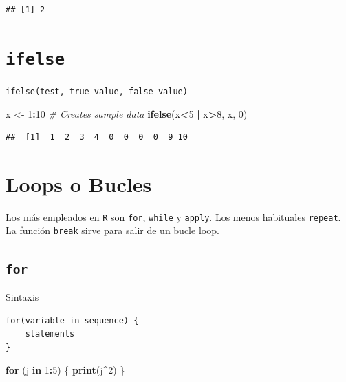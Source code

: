 \documentclass[]{book}
\newenvironment{Shaded}{\begin{snugshade}}{\end{snugshade}}
\newcommand{\KeywordTok}[1]{\textcolor[rgb]{0.13,0.29,0.53}{\textbf{#1}}}
\newcommand{\DecValTok}[1]{\textcolor[rgb]{0.00,0.00,0.81}{#1}}
\newcommand{\StringTok}[1]{\textcolor[rgb]{0.31,0.60,0.02}{#1}}
\newcommand{\CommentTok}[1]{\textcolor[rgb]{0.56,0.35,0.01}{\textit{#1}}}
\newcommand{\ControlFlowTok}[1]{\textcolor[rgb]{0.13,0.29,0.53}{\textbf{#1}}}
\newcommand{\OperatorTok}[1]{\textcolor[rgb]{0.81,0.36,0.00}{\textbf{#1}}}
\newcommand{\NormalTok}[1]{#1}
\begin{document}
\begin{verbatim}
## [1] 2
\end{verbatim}

\section{\texorpdfstring{\texttt{ifelse}}{ifelse}}\label{ifelse}

\texttt{ifelse(test,\ true\_value,\ false\_value)}

\begin{Shaded}
\begin{Highlighting}[]
\NormalTok{x <-}\StringTok{ }\DecValTok{1}\OperatorTok{:}\DecValTok{10} \CommentTok{# Creates sample data}
\KeywordTok{ifelse}\NormalTok{(x}\OperatorTok{<}\DecValTok{5} \OperatorTok{|}\StringTok{ }\NormalTok{x}\OperatorTok{>}\DecValTok{8}\NormalTok{, x, }\DecValTok{0}\NormalTok{)}
\end{Highlighting}
\end{Shaded}

\begin{verbatim}
##  [1]  1  2  3  4  0  0  0  0  9 10
\end{verbatim}

\section{Loops o Bucles}\label{loops-o-bucles}

Los más empleados en \texttt{R} son \texttt{for}, \texttt{while} y
\texttt{apply}. Los menos habituales \texttt{repeat}. La función
\texttt{break} sirve para salir de un bucle loop.

\subsection{\texorpdfstring{\texttt{for}}{for}}\label{for}

Sintaxis

\begin{verbatim}
for(variable in sequence) {
    statements
}
\end{verbatim}

\begin{Shaded}
\begin{Highlighting}[]
\ControlFlowTok{for}\NormalTok{ (j }\ControlFlowTok{in} \DecValTok{1}\OperatorTok{:}\DecValTok{5}\NormalTok{)}
\NormalTok{\{}
  \KeywordTok{print}\NormalTok{(j}\OperatorTok{^}\DecValTok{2}\NormalTok{)}
\NormalTok{\}}
\end{Highlighting}
\end{Shaded}
\end{document}
